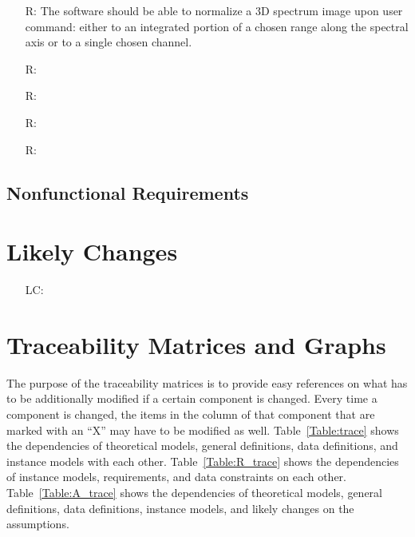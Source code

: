 \documentclass[12pt]{article}
\newcounter{reqnum} %
\newcounter{lcnum} %
\begin{document}
\begin{itemize}
\item[R\refstepcounter{reqnum}\thereqnum \label{R_Inputs}:] The software should be able to normalize a 3D spectrum image upon user command: either to an integrated portion of a chosen range along the spectral axis or to a single chosen channel.

\item[R\refstepcounter{reqnum}\thereqnum \label{R_OutputInputs}:] 

\item[R\refstepcounter{reqnum}\thereqnum \label{R_Calculate}:] 

\item[R\refstepcounter{reqnum}\thereqnum \label{R_VerifyOutput}:]

\item[R\refstepcounter{reqnum}\thereqnum \label{R_Output}:] 

\end{itemize}

\subsection{Nonfunctional Requirements}


\section{Likely Changes}    

\noindent \begin{itemize}

\item[LC\refstepcounter{lcnum}\thelcnum\label{LC_meaningfulLabel}:] 

\end{itemize}

\section{Traceability Matrices and Graphs}

The purpose of the traceability matrices is to provide easy references on what
has to be additionally modified if a certain component is changed.  Every time a
component is changed, the items in the column of that component that are marked
with an ``X'' may have to be modified as well.  Table~\ref{Table:trace} shows the
dependencies of theoretical models, general definitions, data definitions, and
instance models with each other. Table~\ref{Table:R_trace} shows the
dependencies of instance models, requirements, and data constraints on each
other. Table~\ref{Table:A_trace} shows the dependencies of theoretical models,
general definitions, data definitions, instance models, and likely changes on
the assumptions.
\end{document}
